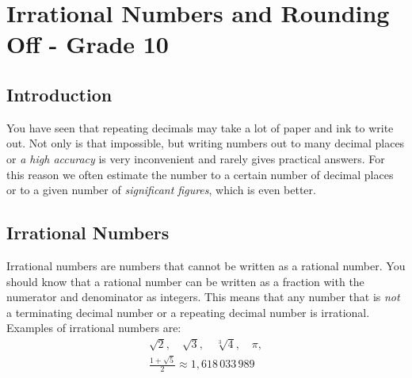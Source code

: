 \documentclass[10pt,a4paper,titlepage,twoside,openright]{report}
\begin{document}




\chapter{Irrational Numbers and Rounding Off - Grade 10}
\label{m:n:re:10}


\section{Introduction}
You have seen that repeating decimals may take a lot of paper and ink to write out. Not only is that impossible, but writing numbers out to many decimal places or \textit{a high accuracy} is very inconvenient and rarely gives practical answers. For this reason we often estimate the number to a certain number of decimal places or to a given number of \textit{significant figures}, which is even better.

\section{Irrational Numbers}

Irrational numbers are numbers that cannot be written as a rational number. You should know that a rational number can be written as a fraction with the numerator and denominator as integers. This means that any number that is \textit{not} a terminating decimal number or a repeating decimal number is irrational. Examples of irrational numbers are:
\begin{eqnarray*}
\sqrt{2},\quad\sqrt{3},\quad\sqrt[3]{4},\quad
\pi,\\
\frac{1 + \sqrt{5}}{2}\approx 1,618\,033\,989\,
\end{eqnarray*}


\end{document}
